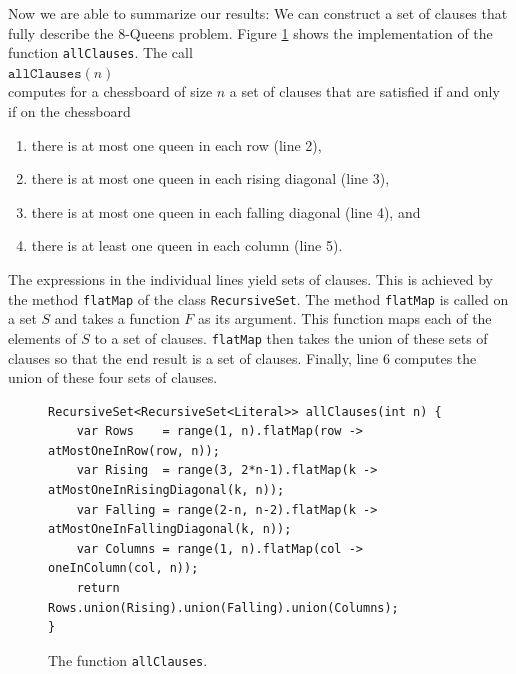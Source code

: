 Now we are able to summarize our results: We can construct a set of clauses that fully describe the 8-Queens problem.
Figure \ref{fig:allClauses} shows the implementation of the function \texttt{allClauses}.
The call \\[0.2cm]
\hspace*{1.3cm} $\texttt{allClauses}(n)$ \\[0.2cm]
computes for a chessboard of size $n$ a set of clauses that
are satisfied if and only if on the chessboard
\begin{enumerate}
\item there is at most one queen in each row (line 2),
\item there is at most one queen in each rising diagonal (line 3),
\item there is at most one queen in each falling diagonal (line 4), and
\item there is at least one queen in each column (line 5).
\end{enumerate}
The expressions in the individual lines yield sets of clauses.  This is achieved by the method \texttt{flatMap}
of the class \texttt{RecursiveSet}.  The method \texttt{flatMap} is called on a set $S$ and takes a function $F$ as
its argument.  This function maps each of the elements of $S$ to a set of clauses.  \texttt{flatMap} then
takes the union of these sets of clauses so that the end result is a set of clauses.  Finally, line 6 computes
the union of these four sets of clauses.

\begin{figure}[!ht]
  \centering
\begin{verbatim}
RecursiveSet<RecursiveSet<Literal>> allClauses(int n) {
    var Rows    = range(1, n).flatMap(row -> atMostOneInRow(row, n));
    var Rising  = range(3, 2*n-1).flatMap(k -> atMostOneInRisingDiagonal(k, n));
    var Falling = range(2-n, n-2).flatMap(k -> atMostOneInFallingDiagonal(k, n));
    var Columns = range(1, n).flatMap(col -> oneInColumn(col, n));
    return Rows.union(Rising).union(Falling).union(Columns);
}
\end{verbatim}
\vspace*{-0.3cm}
  \caption{The function \texttt{allClauses}.}
  \label{fig:allClauses}
\end{figure}

